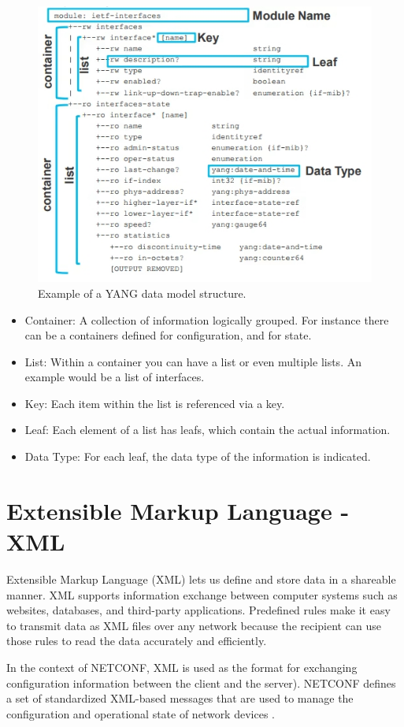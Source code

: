 \begin{figure}[h]
    \centering
    \includegraphics[width=0.7\linewidth]{Images/yang.jpg}
    \caption{Example of a YANG data model structure.}
    \label{fig:yangModels}
\end{figure}


\begin{itemize}
    \item Container: A collection of information logically grouped. For instance there can be a containers defined for configuration, and for state.
    \item List: Within a container you can have a list or even multiple lists. An example would be a list of interfaces.
    \item Key: Each item within the list is referenced via a key.
    \item Leaf: Each element of a list has leafs, which contain the actual information.
    \item Data Type: For each leaf, the data type of the information is indicated.
\end{itemize}

\section{Extensible Markup Language - XML}
Extensible Markup Language (XML) lets us define and store data in a shareable manner. XML supports information exchange between computer systems such as websites, databases, and third-party applications. Predefined rules make it easy to transmit data as XML files over any network because the recipient can use those rules to read the data accurately and efficiently.

In the context of NETCONF, XML is used as the format for exchanging configuration information between the client and the server). NETCONF defines a set of standardized XML-based messages that are used to manage the configuration and operational state of network devices \cite{huawei}.

